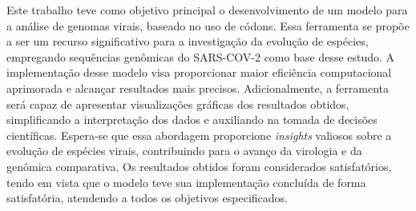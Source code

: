 Este trabalho teve como objetivo principal o desenvolvimento de um modelo para a análise de genomas virais, baseado no uso de códons. Essa ferramenta se propõe a ser um recurso significativo para a investigação da evolução de espécies, empregando sequências genômicas do SARS-COV-2 como base desse estudo. A implementação desse modelo visa proporcionar maior eficiência computacional aprimorada e alcançar resultados mais precisos. Adicionalmente, a ferramenta será capaz de apresentar visualizações gráficas dos resultados obtidos, simplificando a interpretação dos dados e auxiliando na tomada de decisões científicas. Espera-se que essa abordagem proporcione \textit{insights} valiosos sobre a evolução de espécies virais, contribuindo para o avanço da virologia e da genômica comparativa. Os resultados obtidos foram considerados satisfatórios, tendo em vista que o modelo teve sua implementação concluída de forma satisfatória, atendendo a todos os objetivos especificados.

